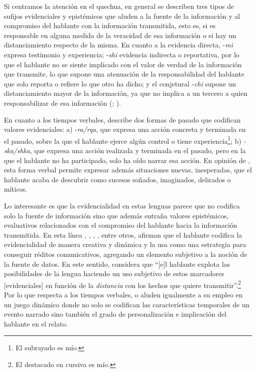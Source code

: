 \documentclass[output=paper]{../langscibook}
\begin{document}
Si centramos la atención en el quechua, en general se describen tres tipos de sufijos evidenciales y epistémicos que aluden a la fuente de la información y al compromiso del hablante con la información transmitida, esto es, si es responsable en alguna medida de la veracidad de esa información o si hay un distanciamiento respecto de la misma. En cuanto a la evidencia directa, -\textit{mi} expresa testimonio y experiencia; -\textit{shi} evidencia indirecta o reportativa, por lo que el hablante no se siente implicado con el valor de verdad de la información que transmite, lo que supone una atenuación de la responsabilidad del hablante que solo reporta o refiere lo que otro ha dicho; y el conjetural -\textit{chi} supone un distanciamiento mayor de la información, ya que no implica a un tercero a quien responsabilizar de esa información (\citealt{Adelaar1997}; \citealt{Weber1989}).

En cuanto a los tiempos verbales, \citet{Cusihuamán1976} describe dos formas de pasado que codifican valores evidenciales: a) {}-\textit{ra/rqa}, que expresa una acción concreta y terminada en el pasado, sobre la que el hablante ejerce algún control o tiene experiencia\footnote{El subrayado es mío.}; b) \textit{-ska/shka}, que expresa una acción realizada y terminada en el pasado, pero en la que el hablante no ha participado, solo ha oído narrar esa acción. En opinión de \citet{Mannheim1987}, esta forma verbal permite expresar además situaciones nuevas, inesperadas, que el hablante acaba de descubrir como sucesos soñados, imaginados, delirados o míticos.

Lo interesante es que la evidencialidad en estas lenguas parece que no codifica solo la fuente de información sino que además entraña valores epistémicos, evaluativos relacionados con el compromiso del hablante hacia la información transmitida. En esta línea \citet{Adelaar1997}, \citet{Faller2007}, \citet{Gipper2014}, \citet{Howard-Malverde1988}, entre otros, afirman que el hablante codifica la evidencialidad de manera creativa y dinámica y la usa como una estrategia para conseguir réditos comunicativos, agregando un elemento subjetivo a la noción de la fuente de datos. En este sentido,  \citet[8––10]{Adelaar1997} considera que “[e]l hablante explota las posibilidades de la lengua haciendo un uso subjetivo de estos marcadores [evidenciales] en función de la \textit{distancia} con los hechos que quiere transmitir”.\footnote{El destacado en cursiva es mío.} Por lo que respecta a los tiempos verbales, \citet[22]{Howard-Malverde1988} o    \citet{MannheimVanVleet2000} aluden igualmente a su empleo en un juego dinámico donde no solo se codifican las características temporales de un evento narrado sino también el grado de personalización e implicación del hablante en el relato.
\end{document}
